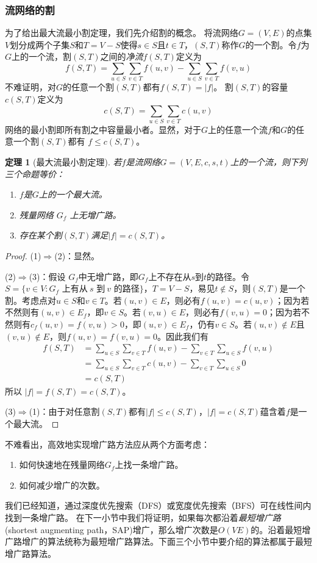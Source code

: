\documentclass{ctexbook}
\newtheorem{theorem}{定理}[chapter] %
\begin{document}
  \subsubsection*{流网络的割}
  为了给出最大流最小割定理，我们先介绍割的概念。
  将流网络$G=(V,E)$的点集$V$划分成两个子集$S$和$T=V-S$使得$s\in S$且$t\in T$，$(S,T)$称作$G$的一个割。令$f$为$G$上的一个流，割$(S,T)$之间的\emph{净流}$f(S,T)$定义为
  \[
  f(S,T) = \sum_{u\in S}\sum_{v\in T}f(u,v) - \sum_{u\in S}\sum_{v\in T}f(v,u)
  \]
  不难证明，对$G$的任意一个割$(S,T)$都有$f(S,T) = |f|$。
  割$(S,T)$的容量$c(S,T)$定义为
  \[
  c(S,T) = \sum_{u\in S}\sum_{v\in T}c(u,v)
  \]
  网络的最小割即所有割之中容量最小者。显然，对于$G$上的任意一个流$f$和$G$的任意一个割$(S,T)$都有 $f \le c(S,T)$。
  \begin{theorem}[最大流最小割定理]
    若$f$是流网络$G=(V,E,c,s,t)$上的一个流，则下列三个命题等价：
    \begin{enumerate}
      \item $f$是$G$上的一个最大流。
      \item 残量网络 $G_f$ 上无增广路。
      \item 存在某个割$(S,T)$满足$|f| = c(S,T)$。
    \end{enumerate}
  \end{theorem}
  \begin{proof}
    (1)$\Rightarrow$(2)：显然。

    (2)$\Rightarrow$(3)：假设 $G_f$中无增广路，即$G_f$上不存在从$s$到$t$的路径。令$S=\{v\in V\colon G_f\text{ 上有从}\ s\text{ 到}\ v\text{ 的路径}\}$，$T=V-S$，易见$t\notin S$，则$(S,T)$是一个割。考虑点对$u\in S$和$v\in T$。若$(u,v)\in E$，则必有$f(u,v)=c(u,v)$；因为若不然则有$(u,v)\in E_f$，即$v\in S$。若$(v,u)\in E$，则必有$f(v,u)=0$；因为若不然则有$c_f(u,v) = f(v,u) > 0$，即$(u,v)\in E_f$，仍有$v \in S$。若$(u,v)\notin E$且$(v,u)\notin E$，则$f(u,v)=f(v,u)=0$。因此我们有
    \begin{align*}
        f(S,T) &= \sum_{u\in S}\sum_{v\in T}f(u,v) - \sum_{v\in T}\sum_{u\in S}f(v,u)\\
        &= \sum_{u\in S}\sum_{v\in T}c(u,v) - \sum_{v\in T}\sum_{u\in S}0\\
        &= c(S, T)
    \end{align*}
    所以 $|f| = f(S,T) = c(S, T)$。

    (3)$\Rightarrow$(1)：由于对任意割$(S,T)$都有$|f|\le c(S,T)$，$|f|=c(S,T)$蕴含着$f$是一个最大流。
  \end{proof}

  不难看出，高效地实现增广路方法应从两个方面考虑：
  \begin{enumerate}
    \item 如何快速地在残量网络$G_f$上找一条增广路。\label{Approach:1}
    \item 如何减少增广的次数。\label{Approach:2}
  \end{enumerate}
  我们已经知道，通过深度优先搜索（DFS）或宽度优先搜索（BFS）可在线性间内找到一条增广路。
  在下一小节中我们将证明，如果每次都沿着\emph{最短增广路}(shortest augmenting path，SAP)增广，那么增广次数是$O(VE)$的。沿着最短增广路增广的算法统称为最短增广路算法。下面三个小节中要介绍的算法都属于最短增广路算法。
\end{document}
